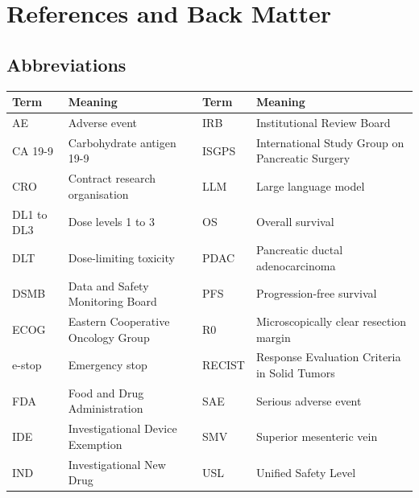 \section{References and Back Matter}


\subsection{Abbreviations}

\vspace{0.30em}

\noindent\begin{tabularx}{\textwidth}{L{2.3cm} Y L{2.3cm} Y}
\toprule
\textbf{Term} & \textbf{Meaning} & \textbf{Term} & \textbf{Meaning} \\
\midrule
AE & Adverse event & IRB & Institutional Review Board \\
CA 19-9 & Carbohydrate antigen 19-9 & ISGPS & International Study Group on Pancreatic Surgery \\
CRO & Contract research organisation & LLM & Large language model \\
DL1 to DL3 & Dose levels 1 to 3 & OS & Overall survival \\
DLT & Dose-limiting toxicity & PDAC & Pancreatic ductal adenocarcinoma \\
DSMB & Data and Safety Monitoring Board & PFS & Progression-free survival \\
ECOG & Eastern Cooperative Oncology Group & R0 & Microscopically clear resection margin \\
e-stop & Emergency stop & RECIST & Response Evaluation Criteria in Solid Tumors \\
FDA & Food and Drug Administration & SAE & Serious adverse event \\
IDE & Investigational Device Exemption & SMV & Superior mesenteric vein \\
IND & Investigational New Drug & USL & Unified Safety Level \\
\bottomrule
\end{tabularx}

\vspace{0.30em}


